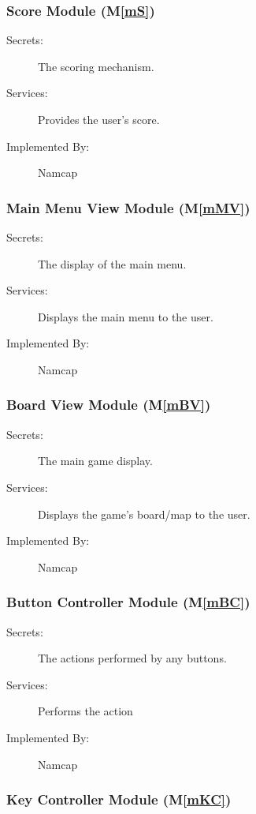 \documentclass[12pt, titlepage]{article}
\newcommand{\mref}[1]{M\ref{#1}}
\begin{document}
\subsubsection{Score Module (\mref{mS})}

\begin{description}
\item[Secrets:]The scoring mechanism.
\item[Services:]Provides the user's score.
\item[Implemented By:] Namcap
\end{description}

\subsubsection{Main Menu View Module (\mref{mMV})}

\begin{description}
\item[Secrets:]The display of the main menu.
\item[Services:]Displays the main menu to the user.
\item[Implemented By:] Namcap
\end{description}

\subsubsection{Board View Module (\mref{mBV})}

\begin{description}
\item[Secrets:]The main game display.
\item[Services:]Displays the game's board/map to the user.
\item[Implemented By:] Namcap
\end{description}

\subsubsection{Button Controller Module (\mref{mBC})}

\begin{description}
\item[Secrets:]The actions performed by any buttons.
\item[Services:]Performs the action 
\item[Implemented By:] Namcap
\end{description}

\subsubsection{Key Controller Module (\mref{mKC})}
\end{document}
